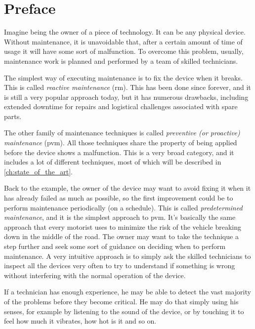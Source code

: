 \section{Preface}
\label{sec:preface}

Imagine being the owner of a piece of technology. It can be any physical device. Without maintenance, it is unavoidable that, after a certain amount of time of usage it will have some sort of malfunction.
To overcome this problem, usually, maintenance work is planned and performed by a team of skilled technicians. 

The simplest way of executing maintenance is to fix the device when it breaks. This is called \emph{reactive maintenance} (\gls{rm}). This has been done since forever, and it is still a very popular approach today, but it has numerous drawbacks, including extended downtime for repairs and logistical challenges associated with spare parts.

The other family of maintenance techniques is called \emph{preventive (or proactive) maintenance} (\gls{pvm}). All those techniques share the property of being applied before the device shows a malfunction. This is a very broad category, and it includes a lot of different techniques, most of which will be described in \autoref{ch:state_of_the_art}.

Back to the example, the owner of the device may want to avoid fixing it when it has already failed as much as possible, so the first improvement could be to perform maintenance periodically (on a schedule). This is called \emph{predetermined maintenance}, and it is the simplest approach to \gls{pvm}. It's basically the same approach that every motorist uses to minimize the risk of the vehicle breaking down in the middle of the road. 
The owner may want to take the technique a step further and seek some sort of guidance on deciding when to perform maintenance. A very intuitive approach is to simply ask the skilled technicians to inspect all the devices very often to try to understand if something is wrong without interfering with the normal operation of the device.

If a technician has enough experience, he may be able to detect the vast majority of the problems before they become critical. He may do that simply using his senses, for example by listening to the sound of the device, or by touching it to feel how much it vibrates, how hot is it and so on. 


